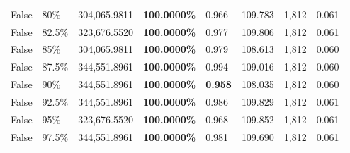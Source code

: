\begin{table}[H]
\begin{tabular}{lllrllll}
\cline{1-8} \cline{2-8}
False & 80\% & \color{red} 304,065.9811 & \bfseries \color{red} 100.0000\% & 0.966 & 109.783 & 1,812 & 0.061 \\
\cline{1-8} \cline{2-8}
False & 82.5\% & 323,676.5520 & \bfseries \color{red} 100.0000\% & 0.977 & 109.806 & 1,812 & 0.061 \\
\cline{1-8} \cline{2-8}
False & 85\% & \color{red} 304,065.9811 & \bfseries \color{red} 100.0000\% & 0.979 & 108.613 & 1,812 & 0.060 \\
\cline{1-8} \cline{2-8}
False & 87.5\% & 344,551.8961 & \bfseries \color{red} 100.0000\% & 0.994 & 109.016 & 1,812 & 0.060 \\
\cline{1-8} \cline{2-8}
False & 90\% & 344,551.8961 & \bfseries \color{red} 100.0000\% & \bfseries \color{red} 0.958 & 108.035 & 1,812 & 0.060 \\
\cline{1-8} \cline{2-8}
False & 92.5\% & 344,551.8961 & \bfseries \color{red} 100.0000\% & 0.986 & 109.829 & 1,812 & 0.061 \\
\cline{1-8} \cline{2-8}
False & 95\% & 323,676.5520 & \bfseries \color{red} 100.0000\% & 0.968 & 109.852 & 1,812 & 0.061 \\
\cline{1-8} \cline{2-8}
False & 97.5\% & 344,551.8961 & \bfseries \color{red} 100.0000\% & 0.981 & 109.690 & 1,812 & 0.061 \\
\cline{1-8} \cline{2-8}
\bottomrule
\end{tabular}
\end{table}
